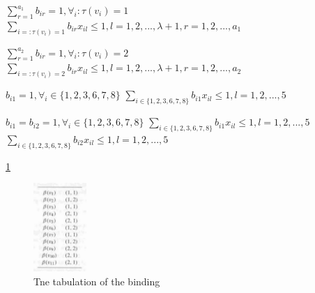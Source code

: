 $ \sum_{r=1}^{a_{1}} b_{ir} = 1,\forall_{i} : \tau(v_{i})=1 $
$ \sum_{i=:\tau(v_{i})=1}^{} b_{ir} x_{il} \leq 1, l=1,2,...,\lambda + 1, r=1,2,...,a_{1}$

$ \sum_{r=1}^{a_{2}} b_{ir} = 1,\forall_{i} : \tau(v_{i})=2$
$ \sum_{i=:\tau(v_{i})=2}^{} b_{ir} x_{il} \leq 1, l=1,2,...,\lambda + 1, r=1,2,...,a_{2}$

$ b_{i1} = 1, \forall_{i} \in \{1,2,3,6,7,8\} $
$ \sum_{i\in \{1,2,3,6,7,8\}}^{} b_{i1} x_{il} \leq 1, l=1,2,...,5$

$ b_{i1}=b_{i2} = 1, \forall_{i} \in \{1,2,3,6,7,8\} $
$ \sum_{i\in \{1,2,3,6,7,8\}}^{} b_{i1} x_{il} \leq 1, l=1,2,...,5$
$ \sum_{i\in \{1,2,3,6,7,8\}}^{} b_{i2} x_{il} \leq 1, l=1,2,...,5$


\ref{fig:tabu}
\begin{figure}[h]
    \centering
    \includegraphics[width=0.18\textwidth]{tabu}
    \caption{ Tne tabulation of the binding \cite{b1}}
    \label{fig:tabu}
\end{figure}






	
%		
		
	


